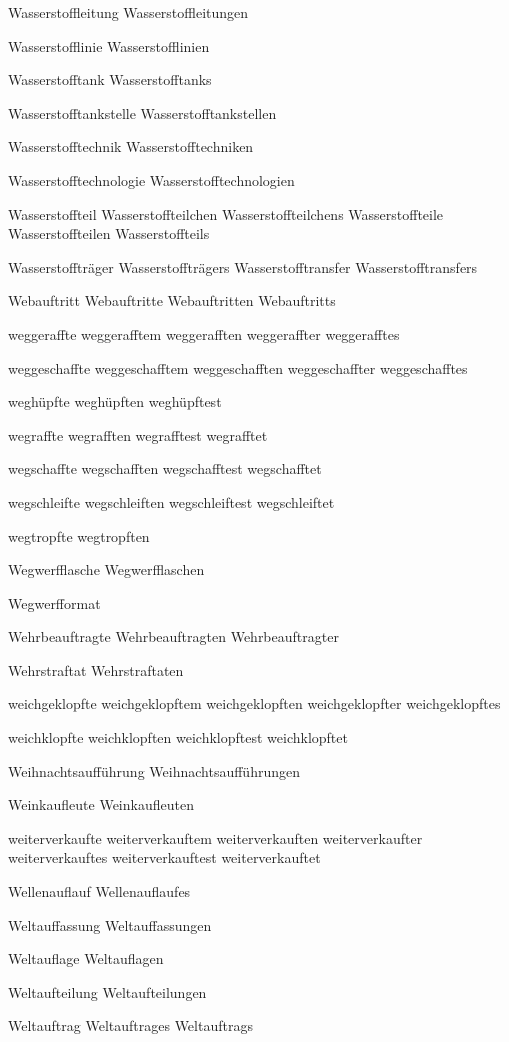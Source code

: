 Wasserstoffleitung
Wasserstoffleitungen

Wasserstofflinie
Wasserstofflinien

Wasserstofftank
Wasserstofftanks

Wasserstofftankstelle
Wasserstofftankstellen

Wasserstofftechnik
Wasserstofftechniken

Wasserstofftechnologie
Wasserstofftechnologien

Wasserstoffteil
Wasserstoffteilchen
Wasserstoffteilchens
Wasserstoffteile
Wasserstoffteilen
Wasserstoffteils

Wasserstoffträger
Wasserstoffträgers
Wasserstofftransfer
Wasserstofftransfers

Webauftritt
Webauftritte
Webauftritten
Webauftritts

weggeraffte
weggerafftem
weggerafften
weggeraffter
weggerafftes

weggeschaffte
weggeschafftem
weggeschafften
weggeschaffter
weggeschafftes

weghüpfte
weghüpften
weghüpftest

wegraffte
wegrafften
wegrafftest
wegrafftet

wegschaffte
wegschafften
wegschafftest
wegschafftet

wegschleifte
wegschleiften
wegschleiftest
wegschleiftet

wegtropfte
wegtropften

Wegwerfflasche
Wegwerfflaschen

Wegwerfformat

Wehrbeauftragte
Wehrbeauftragten
Wehrbeauftragter

Wehrstraftat
Wehrstraftaten

weichgeklopfte
weichgeklopftem
weichgeklopften
weichgeklopfter
weichgeklopftes

weichklopfte
weichklopften
weichklopftest
weichklopftet

Weihnachtsaufführung
Weihnachtsaufführungen

Weinkaufleute
Weinkaufleuten

weiterverkaufte
weiterverkauftem
weiterverkauften
weiterverkaufter
weiterverkauftes
weiterverkauftest
weiterverkauftet

Wellenauflauf
Wellenauflaufes

Weltauffassung
Weltauffassungen

Weltauflage
Weltauflagen

Weltaufteilung
Weltaufteilungen

Weltauftrag
Weltauftrages
Weltauftrags

